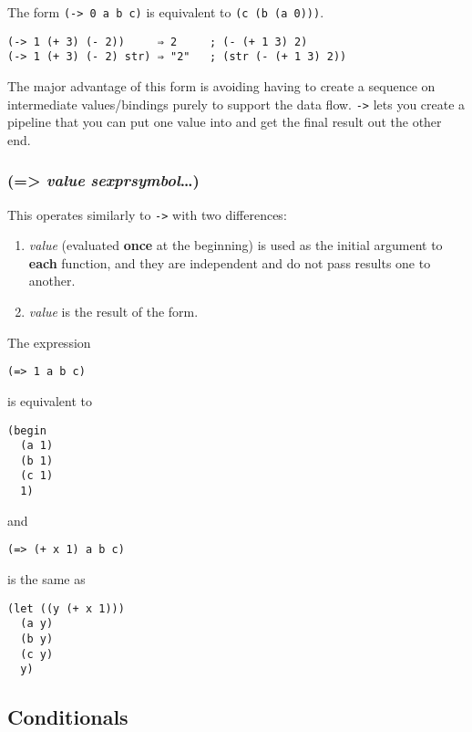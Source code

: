 \documentclass{article}
\begin{document}
The form \verb|(-> 0 a b c)| is equivalent to \verb|(c (b (a 0)))|.

\begin{verbatim}
(-> 1 (+ 3) (- 2))     ⇒ 2     ; (- (+ 1 3) 2)
(-> 1 (+ 3) (- 2) str) ⇒ "2"   ; (str (- (+ 1 3) 2))
\end{verbatim}

The major advantage of this form is avoiding having to create a sequence on intermediate
values/bindings purely to support the data flow. \verb|->| lets you create a
pipeline that you can put one value into and get the final result out the other end.

\subsubsection{(=\textgreater{} \emph{value} \emph{sexpr}\textbar{}\emph{symbol}\ldots{})}

This operates similarly to \verb|->| with two differences:

\begin{enumerate}
\item \emph{value} (evaluated \textbf{once} at the beginning) is used as the initial argument
  to \textbf{each} function, and they are independent and do not pass results one to another.
\item \emph{value} is the result of the form.
\end{enumerate}

The expression

\begin{verbatim}
(=> 1 a b c)
\end{verbatim}

is equivalent to

\begin{verbatim}
(begin
  (a 1)
  (b 1)
  (c 1)
  1)
\end{verbatim}

and

\begin{verbatim}
(=> (+ x 1) a b c)
\end{verbatim}

is the same as

\begin{verbatim}(let ((y (+ x 1)))
  (a y)
  (b y)
  (c y)
  y)
\end{verbatim}

\subsection{Conditionals}\label{sec:conditionals}
\end{document}
